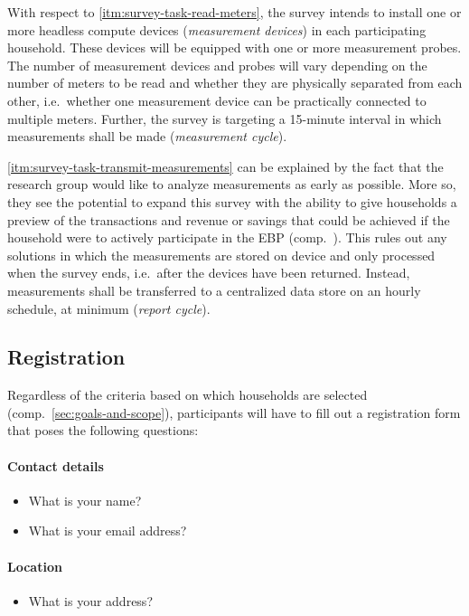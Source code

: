 With respect to \ref{itm:survey-task-read-meters}, the survey intends to install one or more headless compute devices (\textit{measurement devices}) in each participating household. These devices will be equipped with one or more measurement probes. The number of measurement devices and probes will vary depending on the number of meters to be read and whether they are physically separated from each other, i.e.~whether one measurement device can be practically connected to multiple meters. Further, the survey is targeting a 15-minute interval in which measurements shall be made (\textit{measurement cycle}).

\ref{itm:survey-task-transmit-measurements} can be explained by the fact that the research group would like to analyze measurements as early as possible. More so, they see the potential to expand this survey with the ability to give households a preview of the transactions and revenue or savings that could be achieved if the household were to actively participate in the \ac{EBP} (comp.~\cite[p.~63]{stoy2019broker}). This rules out any solutions in which the measurements are stored on device and only processed when the survey ends, i.e.~after the devices have been returned. Instead, measurements shall be transferred to a centralized data store on an hourly schedule, at minimum (\textit{report cycle}).


\subsection{Registration}
\label{sec:survey-registration}

Regardless of the criteria based on which households are selected (comp.~\autoref{sec:goals-and-scope}), participants will have to fill out a registration form that poses the following questions:

\paragraph{Contact details}
\begin{itemize}
  \item What is your name?
  \item What is your email address?
\end{itemize}

\paragraph{Location}
\begin{itemize}
  \item What is your address?
\end{itemize}


